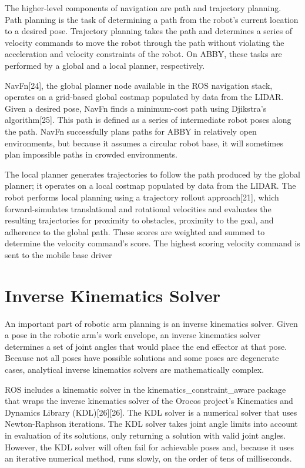 \documentclass[]{cwru} %
\begin{document}
The higher-level components of navigation are path and trajectory
planning. Path planning is the task of determining a path from the
robot's current location to a desired pose. Trajectory planning takes
the path and determines a series of velocity commands to move the robot
through the path without violating the acceleration and velocity
constraints of the robot. On ABBY, these tasks are performed by a global
and a local planner, respectively.

NavFn{[}24{]}, the global planner node available in the ROS navigation
stack, operates on a grid-based global costmap populated by data from
the LIDAR. Given a desired pose, NavFn finds a minimum-cost path using
Djikstra's algorithm{[}25{]}. This path is defined as a series of
intermediate robot poses along the path. NavFn successfully plans paths
for ABBY in relatively open environments, but because it assumes a
circular robot base, it will sometimes plan impossible paths in crowded
environments.

The local planner generates trajectories to follow the path produced by
the global planner; it operates on a local costmap populated by data
from the LIDAR. The robot performs local planning using a trajectory
rollout approach{[}21{]}, which forward-simulates translational and
rotational velocities and evaluates the resulting trajectories for
proximity to obstacles, proximity to the goal, and adherence to the
global path. These scores are weighted and summed to determine the
velocity command's score. The highest scoring velocity command is sent
to the mobile base driver

\section{Inverse Kinematics Solver}

An important part of robotic arm planning is an inverse kinematics
solver. Given a pose in the robotic arm's work envelope, an inverse
kinematics solver determines a set of joint angles that would place the
end effector at that pose. Because not all poses have possible solutions
and some poses are degenerate cases, analytical inverse kinematics
solvers are mathematically complex.

ROS includes a kinematic solver in the kinematics\_constraint\_aware
package that wraps the inverse kinematics solver of the Orocos project's
Kinematics and Dynamics Library (KDL){[}26{]}{[}26{]}. The KDL solver is
a numerical solver that uses Newton-Raphson iterations. The KDL solver
takes joint angle limits into account in evaluation of its solutions,
only returning a solution with valid joint angles. However, the KDL
solver will often fail for achievable poses and, because it uses an
iterative numerical method, runs slowly, on the order of tens of
milliseconds.
\end{document}
